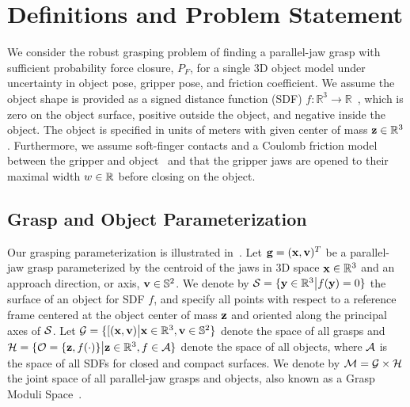 \section{Definitions and Problem Statement}

We consider the robust grasping problem of finding a parallel-jaw grasp with sufficient probability force closure, $P_F$, for a single 3D object model under uncertainty in object pose, gripper pose, and friction coefficient.
We assume the object shape is provided as a signed distance function (SDF) $f: \mathbb{R}^3 \rightarrow \mathbb{R}$~\cite{mahler2015gp, newcombe2011kinectfusion}, which is zero on the object surface, positive outside the object, and negative inside the object. 
The object is specified in units of meters with given center of mass $\mathbf{z} \in \mathbb{R}^3$.
Furthermore, we assume soft-finger contacts and a Coulomb friction model between the gripper and object~\cite{zheng2005} and that the gripper jaws are opened to their maximal width $w \in\mathbb{R}$ before closing on the object.

\subsection{Grasp and Object Parameterization}
Our grasping parameterization is illustrated in~.
Let $\mathbf{g} = (\mathbf{x}, \mathbf{v})^T$ be a parallel-jaw grasp parameterized by the centroid of the jaws in 3D space $\mathbf{x} \in \mathbb{R}^3$ and an approach direction, or axis, $\mathbf{v} \in \mathbb{S}^2$.
We denote by $\mathcal{S} = \{\mathbf{y} \in \mathbb{R}^3 \big| f(\mathbf{y}) = 0\}$ the surface of an object for SDF $f$, and specify all points with respect to a reference frame centered at the object center of mass $\mathbf{z}$ and oriented along the principal axes of $\mathcal{S}$.
Let $\mathcal{G} = \{ [(\mathbf{x}, \mathbf{v}) \big| \mathbf{x} \in \mathbb{R}^3, \mathbf{v} \in \mathbb{S}^2\}$ denote the space of all grasps and $\mathcal{H} = \{ \mathcal{O} = \{\mathbf{z}, f(\cdot)\} \big|  \mathbf{z} \in \mathbb{R}^3, f \in \mathcal{A}\}$ denote the space of all objects, where $\mathcal{A}$ is the space of all SDFs for closed and compact surfaces.
We denote by $\mathcal{M} = \mathcal{G} \times \mathcal{H}$ the joint space of all parallel-jaw grasps and objects, also known as a Grasp Moduli Space~\cite{pokorny2013grasp}.


